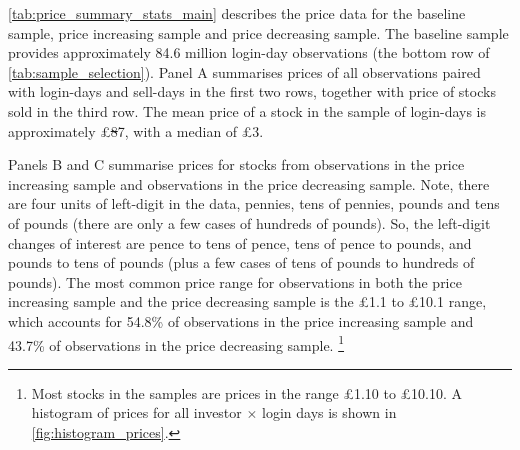 \ref{tab:price_summary_stats_main} describes the price data for the baseline sample, price increasing sample and price decreasing sample. The baseline sample provides approximately 84.6 million login-day observations (the bottom row of \ref{tab:sample_selection}). Panel A summarises prices of all observations paired with login-days and sell-days in the first two rows, together with price of stocks sold in the third row. The mean price of a stock in the sample of login-days is approximately \pounds\st{8}7, with a median of \pounds3. 

Panels B and C summarise prices for stocks from observations in the price increasing sample and observations in the price decreasing sample. Note, there are four units of left-digit in the data, pennies, tens of pennies, pounds and tens of pounds (there are only a few cases of hundreds of pounds). So, the left-digit changes of interest are pence to tens of pence, tens of pence to pounds, and pounds to tens of pounds (plus a few cases of tens of pounds to hundreds of pounds). The most common price range for observations in both the price increasing sample and the price decreasing sample is the \pounds1.1 to \pounds10.1 range, which accounts for 54.8\% of observations in the price increasing sample and 43.7\% of observations in the price decreasing sample. \footnote{Most stocks in the samples are prices in the range \pounds1.10 to \pounds10.10. A histogram of prices for all investor $\times$ login days is shown in \ref{fig:histogram_prices}.}


